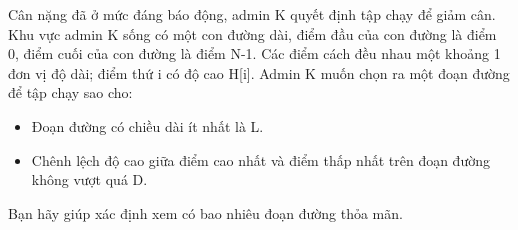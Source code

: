 Cân nặng đã ở mức đáng báo động, admin K quyết định tập chạy để giảm cân. Khu vực admin K sống có một con đường dài, điểm đầu của con đường là điểm 0, điểm cuối của con đường là điểm N-1. Các điểm cách đều nhau một khoảng 1 đơn vị độ dài; điểm thứ i có độ cao H[i]. Admin K muốn chọn ra một đoạn đường để tập chạy sao cho:
\begin{itemize}
	\item Đoạn đường có chiều dài ít nhất là L.
	\item Chênh lệch độ cao giữa điểm cao nhất và điểm thấp nhất trên đoạn đường không vượt quá D.
\end{itemize}

Bạn hãy giúp xác định xem có bao nhiêu đoạn đường thỏa mãn.